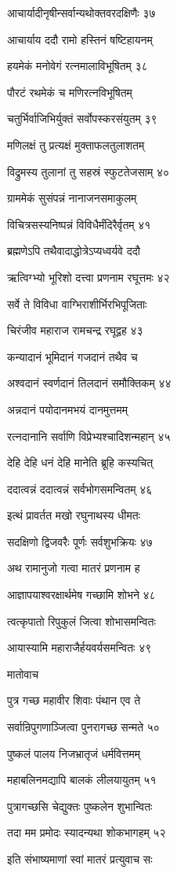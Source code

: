 आचार्यादीनृषीन्सर्वान्यथोक्तवरदक्षिणैः ३७

आचार्याय ददौ रामो हस्तिनं षष्टिहायनम्

हयमेकं मनोवेगं रत्नमालाविभूषितम् ३८

पौरटं रथमेकं च मणिरत्नविभूषितम्

चतुर्भिर्वाजिभिर्युक्तं सर्वोपस्करसंयुतम् ३९

मणिलक्षं तु प्रत्यक्षं मुक्ताफलतुलाशतम्

विद्रुमस्य तुलानां तु सहस्रं स्फुटतेजसाम् ४०

ग्राममेकं सुसंपन्नं नानाजनसमाकुलम्

विचित्रसस्यनिष्पन्नं विविधैर्मंदिरैर्वृतम् ४१

ब्रह्मणेऽपि तथैवादाद्धोत्रेऽप्यध्वर्यवे ददौ

ऋत्विग्भ्यो भूरिशो दत्त्वा प्रणनाम रघूत्तमः ४२

सर्वे ते विविधा वाग्भिराशीर्भिरभिपूजिताः

चिरंजीव महाराज रामचन्द्र रघूद्वह ४३

कन्यादानं भूमिदानं गजदानं तथैव च

अश्वदानं स्वर्णदानं तिलदानं समौक्तिकम् ४४

अन्नदानं पयोदानमभयं दानमुत्तमम्

रत्नदानानि सर्वाणि विप्रेभ्यश्चादिशन्महान् ४५

देहि देहि धनं देहि मानेति ब्रूहि कस्यचित्

ददात्वन्नं ददात्वन्नं सर्वभोगसमन्वितम् ४६

इत्थं प्रावर्तत मखो रघुनाथस्य धीमतः

सदक्षिणो द्विजवरैः पूर्णः सर्वशुभक्रियः ४७

अथ रामानुजो गत्वा मातरं प्रणनाम ह

आज्ञापयाश्वरक्षार्थमेष गच्छामि शोभने ४८

त्वत्कृपातो रिपुकुलं जित्वा शोभासमन्वितः

आयास्यामि महाराजैर्हयवर्यसमन्वितः ४९

मातोवाच

पुत्र गच्छ महावीर शिवाः पंथान एव ते

सर्वान्रिपुगणाञ्जित्वा पुनरागच्छ सन्मते ५०

पुष्कलं पालय निजभ्रातृजं धर्मवित्तमम्

महाबलिनमद्यापि बालकं लीलयायुतम् ५१

पुत्रागच्छसि चेद्युक्तः पुष्कलेन शुभान्वितः

तदा मम प्रमोदः स्यादन्यथा शोकभागहम् ५२

इति संभाष्यमाणां स्वां मातरं प्रत्युवाच सः

